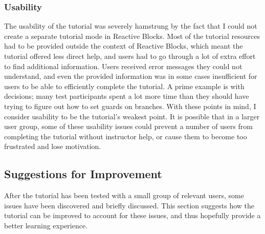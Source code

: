 \subsubsection{Usability}
The usability of the tutorial was severely hamstrung by the fact that I could not create a separate tutorial mode in Reactive Blocks. Most of the tutorial resources had to be provided outside the context of Reactive Blocks, which meant the tutorial offered less direct help, and users had to go through a lot of extra effort to find additional information. Users received error messages they could not understand, and even the provided information was in some cases insufficient for users to be able to efficiently complete the tutorial. A prime example is with decisions; many test participants spent a lot more time than they should have trying to figure out how to set guards on branches. With these points in mind, I consider usability to be the tutorial's weakest point. It is possible that in a larger user group, some of these usability issues could prevent a number of users from completing the tutorial without instructor help, or cause them to become too frustrated and lose motivation.

\subsection{Suggestions for Improvement}
\label{sec:tutorial_improvement}
After the tutorial has been tested with a small group of relevant users, some issues have been discovered and briefly discussed. This section suggests how the tutorial can be improved to account for these issues, and thus hopefully provide a better learning experience. 

